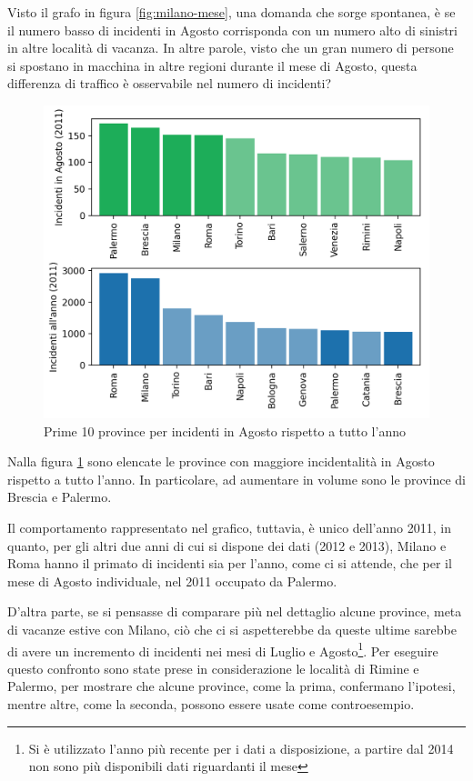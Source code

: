 \documentclass[a4paper,12pt]{report}
\begin{document}
Visto il grafo in figura \ref{fig:milano-mese}, una domanda che sorge spontanea, è se 
il numero basso di incidenti in Agosto corrisponda con un numero alto di sinistri in 
altre località di vacanza. 
In altre parole, visto che un gran numero di persone si spostano in macchina 
in altre regioni durante il mese di Agosto, questa differenza di traffico è osservabile 
nel numero di incidenti?

\begin{figure}
    \includegraphics[width=\linewidth]{../src/incidenti/incidenti_senza_coords/mese_incidenti/mesi_estivi.png}
    \caption{Prime 10 province per incidenti in Agosto rispetto a tutto l'anno}
    \label{fig:mesi-estivi}
\end{figure}

Nalla figura \ref{fig:mesi-estivi} sono elencate le province con maggiore incidentalità 
in Agosto rispetto a tutto l'anno. In particolare, ad aumentare in volume sono le 
province di Brescia e Palermo.

Il comportamento rappresentato nel grafico, tuttavia, è unico dell'anno 2011, in quanto, 
per gli altri due anni di cui si dispone dei dati (2012 e 2013), 
Milano e Roma hanno il primato di incidenti sia per l'anno, come ci si attende, che per il 
mese di Agosto individuale, nel 2011 occupato da Palermo.

D'altra parte, se si pensasse di comparare più nel dettaglio alcune province, 
meta di vacanze estive con Milano, ciò che ci si aspetterebbe da queste ultime sarebbe 
di avere un incremento di incidenti nei mesi di Luglio e 
Agosto\footnote{Si è utilizzato l'anno più recente per i dati a disposizione, 
a partire dal 2014 non sono più disponibili dati riguardanti il mese}.
Per eseguire questo confronto sono state prese in considerazione le località di Rimine e Palermo, 
per mostrare che alcune province, come la prima, confermano l'ipotesi, mentre altre, 
come la seconda, possono essere usate come controesempio.
\end{document}
